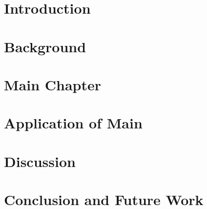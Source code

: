 \documentclass[12pt]{report}
\begin{document}
\beforepreface                      

\newpage






\afterpreface


\chapter{Introduction}
\label{cha:introduction}

      

\chapter{Background}
\label{cha:background}



\chapter{Main Chapter}
\label{cha:main_chapter}



\chapter{Application of Main}
\label{cha:application_of_main}



\chapter{Discussion}
\label{cha:discussion}



\chapter{Conclusion and Future Work}
\label{cha:conclusion_and_future_work}



\appendix
\chapter{\relview}
\label{app:relview}





\newpage
{}
\printindex
\end{document}

